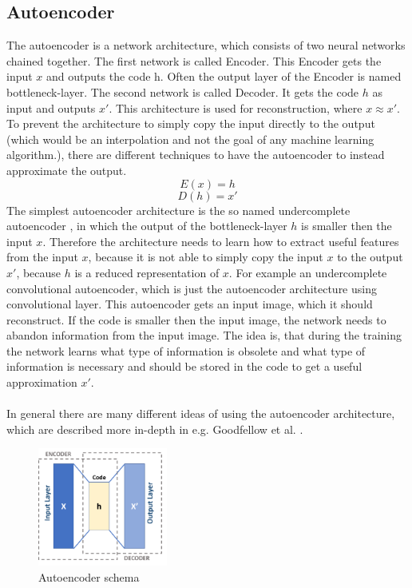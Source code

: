  \subsection{Autoencoder} \label{subsection::autoencoder}
  The autoencoder is a network architecture, which consists of two neural networks chained together. The first network is called Encoder. This Encoder gets the input $x$ and outputs
  the code h. Often the output layer of the Encoder is named bottleneck-layer. The second network is called Decoder. It gets the code $h$ as input
  and outputs $x \prime$. This architecture is used for reconstruction, where $x \approx x \prime$. To prevent the architecture to simply copy the input directly to the output (which would be an
  interpolation and not the goal of any machine learning algorithm.), there are different techniques to have the autoencoder to instead approximate the output.
  \begin{equation}
   E(x) = h
  \end{equation}
  \begin{equation}
   D(h) = x \prime
  \end{equation}
  The simplest autoencoder architecture is the so named undercomplete autoencoder \cite{Goodfellow2016}, in which the output of the bottleneck-layer $h$ is smaller then the input $x$.
  Therefore the architecture needs to learn how to extract useful features from the input $x$, because it is not able to simply copy the input $x$ to the output $x \prime$, because $h$ is a reduced
  representation of $x$.
  For example an undercomplete convolutional autoencoder, which is just the autoencoder architecture using convolutional layer. This autoencoder gets an input 
  image, which it should reconstruct.
  If the code is smaller then the input image, the network needs to abandon information from the input image. The idea is, that during the training the network 
  learns
  what type of information is obsolete and what type of information is necessary and should be stored in the code to get a useful approximation $x \prime$.
  \\\\ 
  In general there are many different ideas of using the autoencoder architecture, which are described more in-depth in e.g. Goodfellow et al. \cite{Goodfellow2016}.
  \begin{figure}[H]
   \includegraphics[width=0.38\textwidth]{../Images/autoencoder_schema.png}
   \centering
   \caption{Autoencoder schema \cite{wiki2019}}
   \label{fig:lstm_architecture}
  \end{figure}
  
